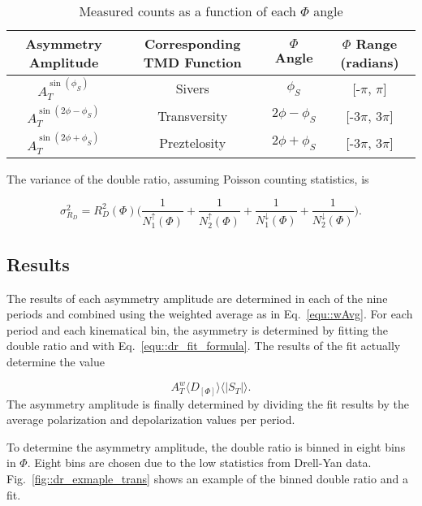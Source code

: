 \begin{table}[h!t]
  \centering
  \caption{Measured counts as a function of each $\Phi$ angle}
  \begin{tabular}{ |c|c|c|c| }
    \hline \textbf{Asymmetry Amplitude}& \textbf{Corresponding TMD Function}&
    \textbf{$\Phi$ Angle}& \textbf{$\Phi$ Range (radians)} \\ \hline
    
    $A^{\sin(\phi_S)}_T$& Sivers& $\phi_S$& [-$\pi$, $\pi$] \\ \hline

    $A^{\sin(2\phi-\phi_S)}_T$& Transversity& $2\phi-\phi_S$& [-3$\pi$, 3$\pi$]
    \\ \hline

    $A^{\sin(2\phi+\phi_S)}_T$& Preztelosity& $2\phi+\phi_S$& [-3$\pi$, 3$\pi$]
    \\ \hline
  \end{tabular}
    \label{tab::ratio_phiAngles}
\end{table}

The variance of the double ratio, assuming Poisson counting statistics, is

\begin{equation}
  \sigma^2_{R_D} = R^2_D(\Phi)\Big(\frac{1}{N_1^\uparrow(\Phi)}
    + \frac{1}{N_2^\uparrow(\Phi)}
    + \frac{1}{N_1^\downarrow(\Phi)}
    +\frac{1}{N_2^\downarrow(\Phi)}
   \Big).
\end{equation}

\subsection{Results}\label{sec::doubleratio_results}
The results of each asymmetry amplitude are determined in each of the nine
periods and combined using the weighted average as in Eq.~\ref{equ::wAvg}.  For
each period and each kinematical bin, the asymmetry is determined by fitting the
double ratio and with Eq.~\ref{equ::dr_fit_formula}.  The results of the fit
actually determine the value

\begin{equation}
  A^w_T \langle D_{[\Phi]} \rangle \langle |S_T|\rangle.
\end{equation}
\noindent
The asymmetry amplitude is finally determined by dividing the fit results by the
average polarization and depolarization values per period.

To determine the asymmetry amplitude, the double ratio is binned in eight bins
in $\Phi$.  Eight bins are chosen due to the low statistics from Drell-Yan data.
Fig.~\ref{fig::dr_exmaple_trans} shows an example of the binned double ratio and
a fit.

